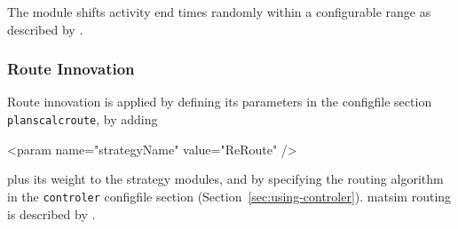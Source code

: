 The module shifts activity end times randomly within a configurable range as described by \citet[][]{BalmerEtAl_Timmermans_2005, Raney_PhDThesis_2005, Balmer_unpub_VSP_2004, BalmerEtAl_unpub_EIRASS_2004, BalmerEtAl_unpub_STRC_2004}. %

\subsubsection{Route Innovation}
\label{sec:routechoice}

Route innovation is applied by defining its parameters in the \gls{configfile} section \lstinline|planscalcroute|, by adding 
%
\begin{xml}
	<param name="strategyName" value="ReRoute" />
\end{xml}
%
plus its weight to the strategy modules, and by specifying the routing algorithm in the \lstinline|controler| \gls{configfile} section (Section~\ref{sec:using-controler}).
\gls{matsim} routing is described by \citet[]{LefebvreBalmer_STRC_2007, LefebvreBalmer_TechRep_IVT_2007}. 

%

